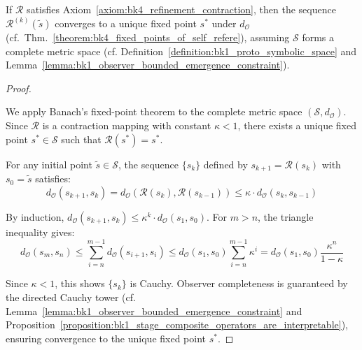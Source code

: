 \begin{proposition}
\label{proposition:bk4_ttpr_convergence}
If $\mathcal{R}$ satisfies Axiom~\ref{axiom:bk4_refinement_contraction}, then the sequence $\mathcal{R}^{(k)}(\tilde{s})$ converges to a unique fixed point $s^*$ under $d_{\mathcal{O}}$ (cf.~Thm.~\ref{theorem:bk4_fixed_points_of_self_refere}), assuming $\mathcal{S}$ forms a complete metric space (cf. Definition~\ref{definition:bk1_proto_symbolic_space} and Lemma~\ref{lemma:bk1_observer_bounded_emergence_constraint}).
\end{proposition}

\begin{proof}
\label{proof:bk4_ttpr_convergence}
\leavevmode

We apply Banach's fixed-point theorem to the complete metric space $(\mathcal{S}, d_{\mathcal{O}})$. Since $\mathcal{R}$ is a contraction mapping with constant $\kappa < 1$, there exists a unique fixed point $s^* \in \mathcal{S}$ such that $\mathcal{R}(s^*) = s^*$. 

For any initial point $\tilde{s} \in \mathcal{S}$, the sequence $\{s_k\}$ defined by $s_{k+1} = \mathcal{R}(s_k)$ with $s_0 = \tilde{s}$ satisfies:
\[
d_{\mathcal{O}}(s_{k+1}, s_k) = d_{\mathcal{O}}(\mathcal{R}(s_k), \mathcal{R}(s_{k-1})) \le \kappa \cdot d_{\mathcal{O}}(s_k, s_{k-1})
\]

By induction, $d_{\mathcal{O}}(s_{k+1}, s_k) \le \kappa^k \cdot d_{\mathcal{O}}(s_1, s_0)$. For $m > n$, the triangle inequality gives:
\[
d_{\mathcal{O}}(s_m, s_n) \le \sum_{i=n}^{m-1} d_{\mathcal{O}}(s_{i+1}, s_i) \le d_{\mathcal{O}}(s_1, s_0) \sum_{i=n}^{m-1} \kappa^i = d_{\mathcal{O}}(s_1, s_0) \frac{\kappa^n}{1-\kappa}
\]

Since $\kappa < 1$, this shows $\{s_k\}$ is Cauchy. Observer completeness is guaranteed by the directed Cauchy tower (cf. Lemma~\ref{lemma:bk1_observer_bounded_emergence_constraint} and Proposition~\ref{proposition:bk1_stage_composite_operators_are_interpretable}), ensuring convergence to the unique fixed point $s^*$.
\end{proof}

